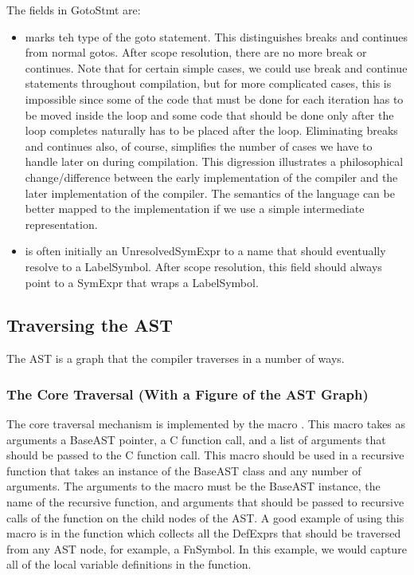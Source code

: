 \documentclass[10pt]{article}
\begin{document}
The fields in GotoStmt are:
\begin{itemize}
\item {} marks teh type of the goto statement.  This
  distinguishes breaks and continues from normal gotos.  After scope
  resolution, there are no more break or continues.  Note that for
  certain simple cases, we could use break and continue statements
  throughout compilation, but for more complicated cases, this is
  impossible since some of the code that must be done for each
  iteration has to be moved inside the loop and some code that should
  be done only after the loop completes naturally has to be placed
  after the loop.  Eliminating breaks and continues also, of course,
  simplifies the number of cases we have to handle later on during
  compilation.  This digression illustrates a philosophical
  change/difference between the early implementation of the compiler
  and the later implementation of the compiler.  The semantics of the
  language can be better mapped to the implementation if we use a
  simple intermediate representation.
\item {} is often initially an UnresolvedSymExpr to a
  name that should eventually resolve to a LabelSymbol.  After scope
  resolution, this field should always point to a SymExpr that wraps a
  LabelSymbol.
\end{itemize}

\subsection{Traversing the AST}
\label{sec:traverse}

The AST is a graph that the compiler traverses in a number of ways.

\subsubsection{The Core Traversal (With a Figure of the AST Graph)}

The core traversal mechanism is implemented by the macro
.  This macro takes as arguments a BaseAST
pointer, a C function call, and a list of arguments that should be
passed to the C function call.  This macro should be used in a
recursive function that takes an instance of the BaseAST class and any
number of arguments.  The arguments to the macro must be the BaseAST
instance, the name of the recursive function, and arguments that
should be passed to recursive calls of the function on the child nodes
of the AST.  A good example of using this macro is in the function
 which collects all the DefExprs that should be
traversed from any AST node, for example, a FnSymbol.  In this
example, we would capture all of the local variable definitions in the
function.
\end{document}
